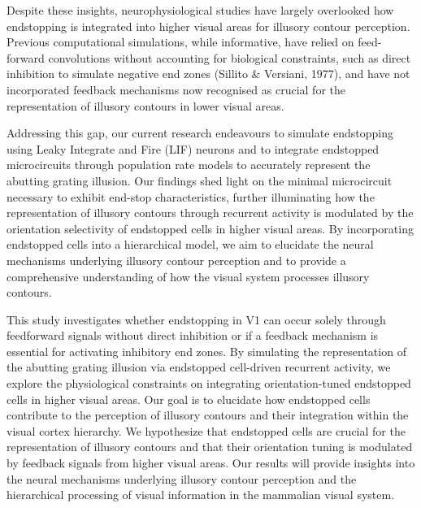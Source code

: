 \documentclass[12pt]{article}
\begin{document}
Despite these insights, neurophysiological studies have largely overlooked how endstopping is integrated into higher visual areas for illusory contour perception. Previous computational simulations, while informative, have relied on feed-forward convolutions without accounting for biological constraints, such as direct inhibition to simulate negative end zones (Sillito \& Versiani, 1977), and have not incorporated feedback mechanisms now recognised as crucial for the representation of illusory contours in lower visual areas.

Addressing this gap, our current research endeavours to simulate endstopping using Leaky Integrate and Fire (LIF) neurons and to integrate endstopped microcircuits through population rate models to accurately represent the abutting grating illusion. Our findings shed light on the minimal microcircuit necessary to exhibit end-stop characteristics, further illuminating how the representation of illusory contours through recurrent activity is modulated by the orientation selectivity of endstopped cells in higher visual areas. By incorporating endstopped cells into a hierarchical model, we aim to elucidate the neural mechanisms underlying illusory contour perception and to provide a comprehensive understanding of how the visual system processes illusory contours.

This study investigates whether endstopping in V1 can occur solely through feedforward signals without direct inhibition or if a feedback mechanism is essential for activating inhibitory end zones. By simulating the representation of the abutting grating illusion via endstopped cell-driven recurrent activity, we explore the physiological constraints on integrating orientation-tuned endstopped cells in higher visual areas. Our goal is to elucidate how endstopped cells contribute to the perception of illusory contours and their integration within the visual cortex hierarchy. We hypothesize that endstopped cells are crucial for the representation of illusory contours and that their orientation tuning is modulated by feedback signals from higher visual areas. Our results will provide insights into the neural mechanisms underlying illusory contour perception and the hierarchical processing of visual information in the mammalian visual system.


\newpage
\end{document}
